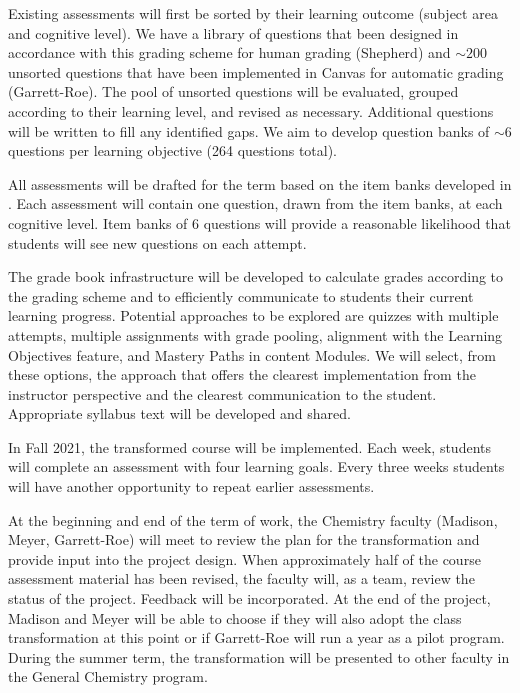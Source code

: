 \documentclass[10pt,letterpaper]{article}
\begin{document}

\label{ssa:question_bank} Existing assessments will first be sorted by their learning outcome (subject area and cognitive level). We have a library of  questions that been designed in accordance with this grading scheme for human grading (Shepherd) and $\sim200$ unsorted questions that have been implemented in Canvas for automatic grading (Garrett-Roe). The pool of unsorted questions will be evaluated, grouped according to their learning level, and revised as necessary. Additional questions will be written to fill any identified gaps. We aim to develop question banks of $\sim6$ questions per learning objective (264 questions total). 



All assessments will be drafted for the term based on the item banks developed in . Each assessment will contain one question, drawn from the item banks, at each cognitive level. Item banks of 6 questions will provide a reasonable likelihood that students will see new questions on each attempt.

The grade book infrastructure will be developed to calculate grades according to the grading scheme and to efficiently communicate to students their current learning progress. Potential approaches to be explored are quizzes with multiple attempts, multiple assignments with grade pooling, alignment with the Learning Objectives feature, and Mastery Paths in content Modules. We will select, from these options, the approach that offers the clearest implementation from the instructor perspective and the clearest communication to the student. Appropriate syllabus text will be developed and shared.
 
In Fall 2021, the transformed course will be implemented. Each week, students will complete an assessment with four learning goals. Every three weeks students will have another opportunity to repeat earlier assessments.

At the beginning and end of the term of work, the \pogil Chemistry faculty (Madison, Meyer, Garrett-Roe) will meet to review the plan for the transformation and provide input into the project design. When approximately half of the course assessment material has been revised, the \pogil faculty will, as a team, review the status of the project. Feedback will be incorporated. At the end of the project, Madison and Meyer will be able to choose if they will also adopt the class transformation at this point or if Garrett-Roe will run a year as a pilot program. During the summer term, the transformation will be presented to other faculty in the General Chemistry program.
\end{document}
